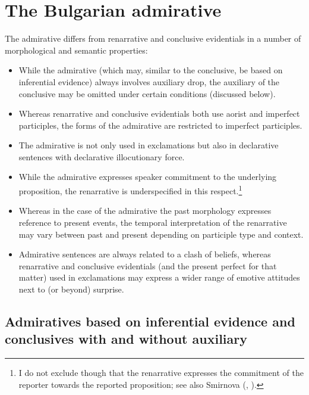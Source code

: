 \documentclass[output=paper]{langscibook}
\begin{document}
\section{The Bulgarian admirative}\label{sec:BG-admirative}\largerpage

The  admirative differs from renarrative and conclusive evidentials in a number of morphological and semantic properties:

\begin{itemize}
    \item While the admirative (which may, similar to the conclusive, be based on inferential evidence) always involves auxiliary drop, the auxiliary of the conclusive may be omitted under certain conditions (discussed below).
    \item Whereas renarrative and conclusive evidentials both use aorist and imperfect participles, the forms of the admirative are restricted to imperfect participles.
    \item The admirative is not only used in exclamations but also in declarative sentences with declarative illocutionary force.
    \item While the admirative expresses speaker commitment to the underlying proposition, the renarrative is underspecified in this respect.\footnote{I do not exclude though that the renarrative expresses the commitment of the reporter towards the reported proposition; see also Smirnova (\citeyear{Smirnova2011a}, \citeyear{Smirnova2013}).}
    \item Whereas in the case of the admirative the past morphology expresses reference to present events, the temporal interpretation of the renarrative may vary between past and present depending on participle type and context.
    \item Admirative sentences are always related to a clash of beliefs, whereas renarrative and conclusive evidentials (and the present perfect for that matter) used in exclamations may express a wider range of emotive attitudes next to (or beyond) surprise.
\end{itemize}

\subsection{Admiratives based on inferential evidence and conclusives with and without auxiliary}
\end{document}
